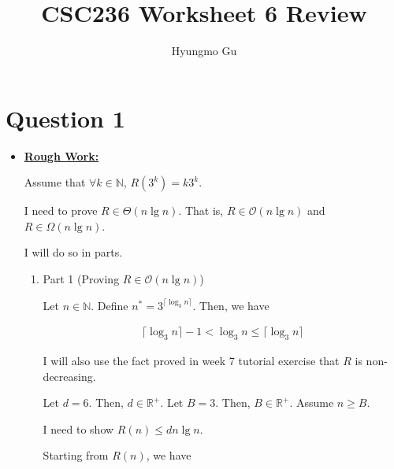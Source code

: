 \documentclass[12pt]{article}
\begin{document}
\title{CSC236 Worksheet 6 Review}
\author{Hyungmo Gu}
\maketitle

\section*{Question 1}
\begin{itemize}
    \item
    \begin{mdframed}
        \underline{\textbf{Rough Work:}}

        \bigskip

        Assume that $\forall k \in \mathbb{N}$, $R(3^k)=k3^k$.

        \bigskip

        I need to prove $R \in \Theta(n \lg n)$. That is, $R \in \mathcal{O}(n \lg n)$
        and $R \in \Omega(n \lg n)$.

        \bigskip

        I will do so in parts.

        \begin{enumerate}[1.]
            \item Part 1 (Proving $R \in \mathcal{O}(n \lg n)$)

            \begin{mdframed}

            Let $n \in \mathbb{N}$. Define $n^* = 3^{\lceil \log_3 n \rceil}$.
            Then, we have

            \begin{align}
                \lceil \log_3 n \rceil - 1 < \log_3 n \leq \lceil \log_3 n \rceil
            \end{align}

            \bigskip

            I will also use the fact proved in week 7 tutorial exercise that
            $R$ is non-decreasing.

            \bigskip

            Let $d = 6$. Then, $d \in \mathbb{R}^+$. Let $B = 3$. Then, $B \in \mathbb{R}^+$.
            Assume $n \geq B$.

            \bigskip

            I need to show $R(n) \leq dn\lg n$.

            \bigskip

            Starting from $R(n)$, we have


\end{mdframed}
\end{enumerate}
\end{mdframed}
\end{itemize}
\end{document}
